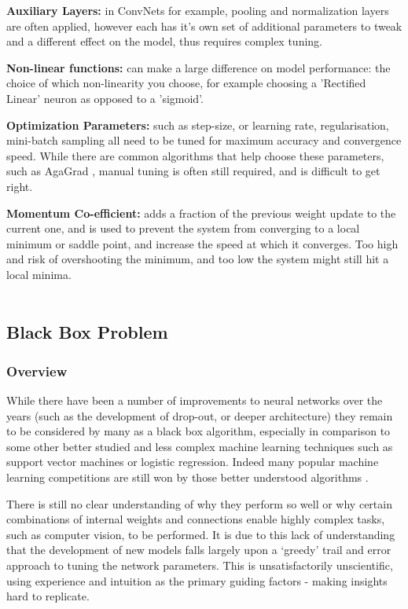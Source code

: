 \documentclass[a4paper,11pt,titlepage]{article}
\begin{document}
		\par 
		\textbf{Auxiliary Layers:} in ConvNets for example, pooling and normalization layers are often applied, however each has it's own set of additional parameters to tweak and a different effect on the model, thus requires complex tuning.
		\par 
		\textbf{Non-linear functions:} can make a large difference on model performance: the choice of which non-linearity you choose, for example choosing a 'Rectified Linear' neuron as opposed to a 'sigmoid'. 
		\par 
		\textbf{Optimization Parameters:} such as step-size, or learning rate, regularisation, mini-batch sampling all need to be tuned for maximum accuracy and convergence speed. While there are common algorithms that help choose these parameters, such as AgaGrad \cite{Duchi2011}, manual tuning is often still required, and is difficult to get right.
		\par
		\textbf{Momentum Co-efficient:} adds a fraction of the previous weight update to the current one, and is used to prevent the system from converging to a local minimum or saddle point, and increase the speed at which it converges. Too high and risk of overshooting the minimum, and too low the system might still hit a local minima.
\\\
	\subsection{Black Box Problem}
		\subsubsection{Overview}
		While there have been a number of improvements to neural networks over the years (such as the development of drop-out, or deeper architecture) they remain to be considered by many as a black box algorithm, especially in comparison to some other better studied and less complex machine learning techniques such as support vector machines or logistic regression. Indeed many popular machine learning competitions are still won by those better understood algorithms \cite{Adams2015}.
		\par 
		There is still no clear understanding of why they perform so well or why certain combinations of internal weights and connections enable highly complex tasks, such as computer vision, to be performed. It is due to this lack of understanding that the development of new models falls largely upon a `greedy' trail and error approach to tuning the network parameters. This is unsatisfactorily unscientific, using experience and intuition as the primary guiding factors - making insights hard to replicate.
		\par
		
\end{document}
